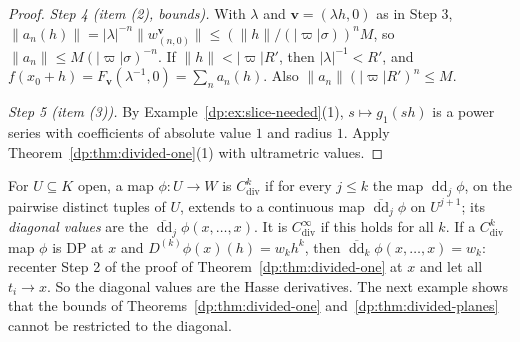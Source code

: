 \documentclass[11pt]{amsart}
\theoremstyle{definition}
\theoremstyle{remark}
\numberwithin{equation}{section}
\newcommand{\abs}[1]{\lvert #1\rvert}
\newcommand{\norm}[1]{\lVert #1\rVert}
\theoremstyle{plain}
\theoremstyle{definition}
\theoremstyle{plain}
\begin{document}
\begin{proof}
\emph{Step 4 (item (2), bounds).} With $\lambda$ and $\mathbf v=(\lambda h,0)$ as in Step 3, $\norm{a_n(h)}=\abs\lambda^{-n}\norm{w^{\mathbf v}_{(n,0)}}\le(\norm h/(\abs\varpi\sigma))^nM$, so $\norm{a_n}\le M(\abs\varpi\sigma)^{-n}$. If $\norm h<\abs\varpi R'$, then $\abs\lambda^{-1}<R'$, and $f(x_0+h)=F_{\mathbf v}(\lambda^{-1},0)=\sum_na_n(h)$. Also $\norm{a_n}(\abs\varpi R')^n\le M$.

\emph{Step 5 (item (3)).} By Example~\ref{dp:ex:slice-needed}(1), $s\mapsto g_1(sh)$ is a power series with coefficients of absolute value $1$ and radius $1$. Apply Theorem~\ref{dp:thm:divided-one}(1) with ultrametric values.
\end{proof}

For $U\subseteq K$ open, a map $\phi\colon U\to W$ is \emph{$C^k_{\mathrm{div}}$} if for every $j\le k$ the map $\operatorname{dd}_j\phi$, on the pairwise distinct tuples of $U$, extends to a continuous map $\overline{\operatorname{dd}}_j\phi$ on $U^{j+1}$; its \emph{diagonal values} are the $\overline{\operatorname{dd}}_j\phi(x,\dots,x)$. It is \emph{$C^\infty_{\mathrm{div}}$} if this holds for all $k$. If a $C^k_{\mathrm{div}}$ map $\phi$ is DP at $x$ and $D^{(k)}\phi(x)(h)=w_kh^k$, then $\overline{\operatorname{dd}}_k\phi(x,\dots,x)=w_k$: recenter Step 2 of the proof of Theorem~\ref{dp:thm:divided-one} at $x$ and let all $t_i\to x$. So the diagonal values are the Hasse derivatives. The next example shows that the bounds of Theorems~\ref{dp:thm:divided-one} and~\ref{dp:thm:divided-planes} cannot be restricted to the diagonal.
\end{document}
